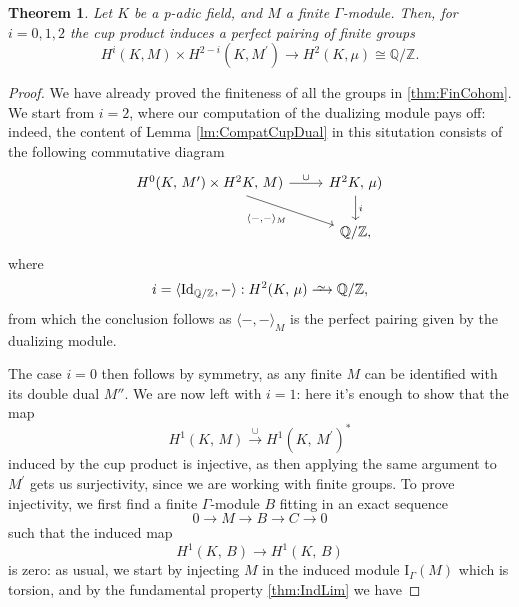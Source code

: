 \documentclass[a4paper, oneside]{memoir}
\def\Q{\mathbb{Q}}
\def\Z{\mathbb{Z}}
\def\K{K}
\renewcommand{\H}[3]{H^{#1}( #2, \, #3 )}
\newcommand{\HH}[2]{H^2 #1, \, #2 )}
\newcommand{\Ind}[2]{\mathrm{I}_{#1}(#2)}
\newcommand\Iso{\xrightarrow{
   \,\smash{\raisebox{-0.65ex}{\ensuremath{\scriptstyle\sim}}}\,}}
\theoremstyle{plain}
\newtheorem{theorem}{Theorem}[section]
\theoremstyle{definition}
\theoremstyle{remark}
\begin{document}
\begin{theorem}
    Let $\K$ be a p-adic field, and $M$ a finite $\Gamma$-module.
    Then, for $i=0,1,2$ the cup product induces a perfect pairing of finite groups
    \begin{equation*}
        H^i(\K, M) \times H^{2-i}(\K, M^{\prime}) \to H^2(\K, \mu) \cong \Q/\Z.
    \end{equation*}
\end{theorem}
\begin{proof}
    We have already proved the finiteness of all the groups in \eqref{thm:FinCohom}.
    We start from $i=2$, where our computation of the dualizing module pays off: indeed, the content of Lemma \eqref{lm:CompatCupDual}
    in this situtation consists of the following commutative diagram
    \begin{equation*}
        \begin{tikzcd}
            {\H{0}{\K}{M^\prime}  \times \HH{\K}{M}} \ar[swap, rd, "\langle - {,} - \rangle_M "] \ar[r, "\cup"] & \HH{\K}{\mu} \ar[d, "i"] \\
            & \Q/\Z,
        \end{tikzcd}
    \end{equation*}
    where
    \[
        i = \langle \operatorname{Id}_{\Q/\Z}, - \rangle : \H{2}{\K}{\mu} \Iso \Q/\Z,
    \]
    from which the conclusion follows as $\langle -{,}- \rangle_M$ is the perfect pairing given by the dualizing module.

    The case $i=0$ then follows by symmetry, as any finite $M$ can be identified with its double dual $M''$.
    We are now left with $i=1$: here it's enough to show that the map
    \[
        \H{1}{\K}{M} \overset{\cup}{\to} \H{1}{\K}{M^\prime}^*
    \]
    induced by the cup product is injective, as then applying the same argument to $M^\prime$ gets us surjectivity, since we are working with finite groups.
    To prove injectivity, we first find a finite $\Gamma$-module $B$ fitting in an exact sequence
    \begin{equation}\label{eq:InjSeq}
        0\to M\to B\to C\to 0
    \end{equation}
    such that the induced map
    \[
        \H{1}{\K}{B}\to\H{1}{\K}{B}
    \]
    is zero:
    as usual, we start by injecting $M$ in the induced module $\Ind{\Gamma}{M}$ which is torsion, and by the fundamental property \eqref{thm:IndLim} we have


\end{proof}
\end{document}
